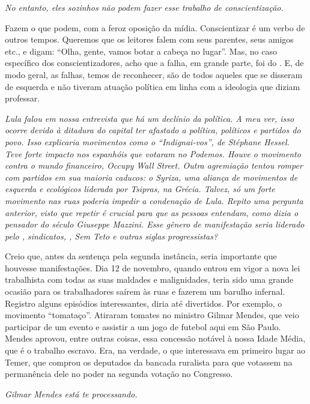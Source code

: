 \itshape
 No entanto, eles sozinhos não podem fazer esse trabalho
de conscientização.

\normalfont
Fazem o que podem, com a feroz oposição da mídia.
Conscientizar é um verbo de outros tempos. Queremos que os leitores
falem com seus parentes, seus amigos etc., e digam: ``Olha, gente, vamos
botar a cabeça no lugar''. Mas, no caso específico dos
conscientizadores, acho que a falha, em grande parte, foi do . E, de
modo geral, as falhas, temos de reconhecer, são de todos aqueles que se
disseram de esquerda e não tiveram atuação política em linha com a
ideologia que diziam professar.

\itshape
 Lula falou em nossa entrevista que há um declínio da
política. A meu ver, isso ocorre devido à ditadura do capital ter
afastado a política, políticos e partidos do povo. Isso explicaria
movimentos como o ``Indignai-vos'', de Stéphane Hessel. Teve forte
impacto nos espanhóis que votaram no Podemos. Houve o movimento contra o
mundo financeiro, Occupy Wall Street. Outra agremiação tentou romper com
partidos em sua maioria caducos: o Syriza, uma aliança de movimentos de
esquerda e ecológicos liderada por Tsipras, na Grécia. Talvez, só um
forte movimento nas ruas poderia impedir a condenação de Lula. Repito
uma pergunta anterior, visto que repetir é crucial para que as pessoas
entendam, como dizia o pensador do século  Giuseppe Mazzini. Esse
gênero de manifestação seria liderado pelo , sindicatos, , Sem Teto
e outras siglas progressistas?

\normalfont
Creio que, antes da sentença pela segunda instância,
seria importante que houvesse manifestações. Dia 12 de novembro, quando
entrou em vigor a nova lei trabalhista com todas as suas maldades e
malignidades, teria sido uma grande ocasião para os trabalhadores saírem
às ruas e fazerem um barulho infernal. Registro alguns episódios
interessantes, diria até divertidos. Por exemplo, o movimento
``tomataço''. Atiraram tomates no ministro Gilmar Mendes, que veio
participar de um evento e assistir a um jogo de futebol aqui em São
Paulo. Mendes aprovou, entre outras coisas, essa concessão notável à
nossa Idade Média, que é o trabalho escravo. Era, na verdade, o que
interessava em primeiro lugar ao Temer, que comprou os deputados da
bancada ruralista para que votassem na permanência dele no poder na
segunda votação no Congresso.

\itshape
 Gilmar Mendes está te processando.

